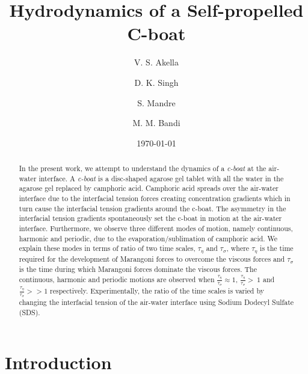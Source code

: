 \documentclass[aps, twocolumn, floatfix, superscriptaddress]{revtex4}
\begin{document}
\title{Hydrodynamics of a Self-propelled C-boat}

\author{V. S. Akella}
\author{D. K. Singh}
\author{S. Mandre}
\author{M. M. Bandi}

\date{\today}

\begin{abstract}
In the present work, we attempt to understand the dynamics of a \emph{c-boat} at the air-water interface. A \emph{c-boat} is a disc-shaped agarose gel tablet with all the water in the agarose gel replaced by camphoric acid. Camphoric acid spreads over the air-water interface due to the interfacial tension forces creating concentration gradients which in turn cause the interfacial tension gradients around the c-boat. The asymmetry in the interfacial tension gradients spontaneously set the c-boat in motion at the air-water interface. Furthermore, we observe three different modes of motion, namely continuous, harmonic and periodic, due to the evaporation/sublimation of camphoric acid. We explain these modes in terms of ratio of two time scales, $\tau_{\eta}$ and $\tau_{\sigma}$, where $\tau_{\eta}$ is the time required for the development of Marangoni forces to overcome the viscous forces and $\tau_{\sigma}$ is the time during which Marangoni forces dominate the viscous forces. The continuous, harmonic and periodic motions are observed when $\frac{\tau_{\eta}}{\tau_{\sigma}} \approx 1$,  $\frac{\tau_{\eta}}{\tau_{\sigma}} >~ 1$ and $\frac{\tau_{\eta}}{\tau_{\sigma}} >> 1$ respectively. Experimentally, the ratio of the time scales is varied by changing the interfacial tension of the air-water interface using Sodium Dodecyl Sulfate (SDS).
\end{abstract}

\maketitle
\section{Introduction}
\end{document}
